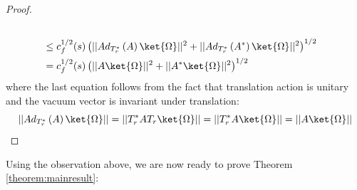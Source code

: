 \documentclass[a4paper,11pt]{article}
\theoremstyle{definition}
\theoremstyle{remark}
\newcommand{\lb}{\left(}
\newcommand{\rb}{\right)}
\begin{document}
\begin{proof}
\begin{align}
\begin{split}
            \\&\leq c^{1/2}_f(s)\lb||Ad_{T_r^*}\lb A \rb\ket{\Omega}||^2 + ||Ad_{T^*_r}\lb A^*\rb\ket{\Omega}||^2\rb^{1/2}
            \\&
            =c_f^{1/2}(s)\lb ||A\ket{\Omega}||^2 + ||A^*\ket{\Omega}||^2 \rb^{1/2}
        \end{split}
    \end{align}
    where the last equation follows from the fact that translation action is unitary and the vacuum vector is invariant under translation:
    \begin{equation}
        ||Ad_{T_r^*}\lb A \rb\ket{\Omega}|| = ||T^*_rAT_r\ket{\Omega}|| = ||T_r^*A\ket{\Omega}|| = ||A\ket{\Omega}||\qedhere
    \end{equation}
\end{proof}
Using the observation above, we are now ready to prove Theorem \ref{theorem:mainresult}:
\end{document}
